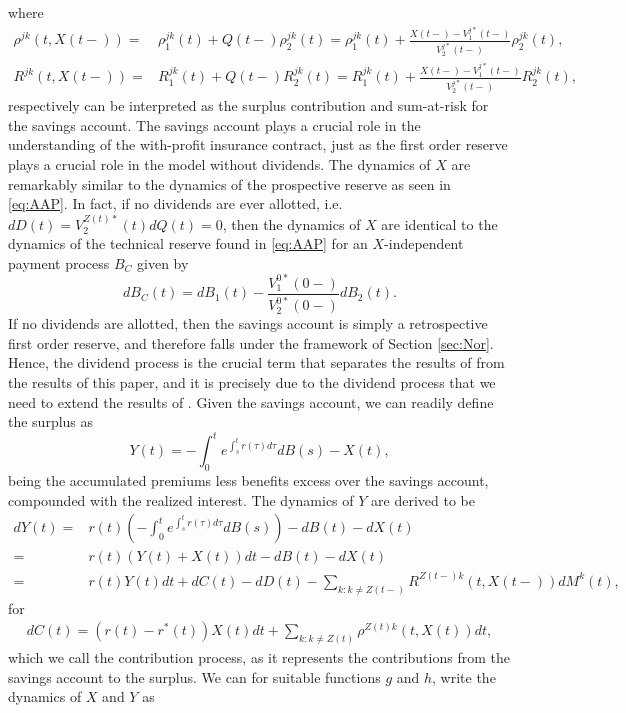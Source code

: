 \documentclass[12pt]{article}
\theoremstyle{my_thm}
\begin{document}
where
\begin{align*}
\rho^{jk}(t,X(t-))=&\rho_1^{jk}(t)+Q(t-)\rho_2^{jk}(t)=\rho_1^{jk}(t)+\frac{X(t-)-V_1^{j*}(t-)}{V_2^{j*}(t-)}\rho_2^{jk}(t),
\\
R^{jk}(t,X(t-))=&R_1^{jk}(t)+Q(t-)R_2^{jk}(t)=R_1^{jk}(t)+\frac{X(t-)-V_1^{j*}(t-)}{V_2^{j*}(t-)}R_2^{jk}(t),
\end{align*}
respectively can be interpreted as the surplus contribution and sum-at-risk for the savings account. The savings account plays a crucial role in the understanding of the with-profit insurance contract, just as the first order reserve plays a crucial role in the model without dividends. The dynamics of $X$ are remarkably similar to the dynamics of the prospective reserve as seen in \eqref{eq:AAP}. In fact, if no dividends are ever allotted, i.e. $dD(t)=V_2^{Z(t)*}(t)dQ(t)=0$, then the dynamics of $X$ are identical to the dynamics of the technical reserve found in \eqref{eq:AAP} for an $X$-independent payment process $B_C$ given  by
$$
dB_C(t)=dB_1(t)-\frac{V_1^{0*}(0-)}{V_2^{0*}(0-)}dB_2(t).
$$
If no dividends are allotted, then the savings account is simply a retrospective first order reserve, and therefore falls under the framework of Section \ref{sec:Nor}. Hence, the dividend process is the crucial term that separates the results of \citet{Norberg} from the results of this paper, and it is precisely due to the dividend process that we need to extend the results of \citet{Norberg}. Given the savings account, we can readily define the surplus as
$$
Y(t)= - \int_0^t e^{\int_s^t r(\tau) d\tau} dB(s)-X(t),
$$
being the accumulated premiums less benefits excess over the savings account, compounded with the realized interest. The dynamics of $Y$ are derived to be
\begin{align}
dY(t)=&
 r(t) \left( -\int_0^t e^{\int_s^t r(\tau) d\tau} dB(s) \right) - dB(t) -dX(t) \nonumber
\\
=&
r(t) \left(Y(t) + X(t) \right)dt - dB(t) -dX(t) \nonumber \\
=& r(t) Y(t) dt + dC(t)-dD(t)-
\sum_{k:k \neq Z(t-)}  R^{Z(t-)k}(t,X(t-)) dM^k(t), \label{eq:AAC}
\end{align}
for 
\begin{gather*}
dC(t)=(r(t)-r^*(t))X(t)dt+\sum_{k:k\neq Z(t)} \rho^{Z(t)k}(t,X(t)) dt,
\end{gather*}
which we call the contribution process, as it represents the contributions from the savings account to the surplus.  We can for suitable functions $g$ and $h$, write the dynamics of $X$ and $Y$ as
\end{document}
